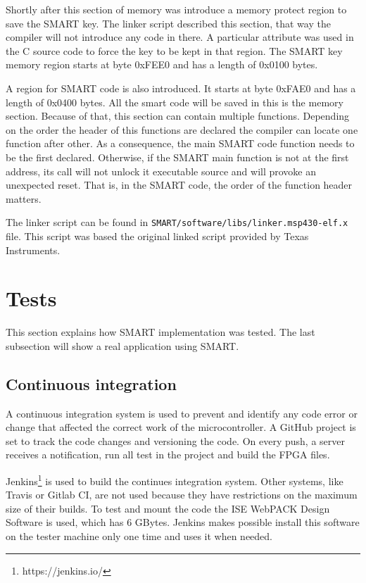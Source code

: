 Shortly after this section of memory was introduce a memory protect region to save the SMART key. The linker script described this section, that way the compiler will not introduce any code in there. A particular attribute was used in the C source code to force the key to be kept in that region. The SMART key memory region starts at byte 0xFEE0 and has a length of  0x0100 bytes.

A region for SMART code is also introduced. It starts at byte 0xFAE0 and has a length of 0x0400 bytes. All the smart code will be saved in this is the memory section. Because of that, this section can contain multiple functions. Depending on the order the header of this functions are declared the compiler can locate one function after other. As a consequence, the main SMART code function needs to be the first declared. Otherwise, if the SMART main function is not at the first address, its call will not unlock it executable source and will provoke an unexpected reset. That is, in the SMART code, the order of the function header matters.

The linker script can be found in \verb|SMART/software/libs/linker.msp430-elf.x| file. This script was based the original linked script provided by Texas Instruments.

\section{Tests}

This section explains how SMART implementation was tested. The last subsection will show a real application using SMART. 

\subsection{Continuous integration}

A continuous integration system is used to prevent and identify any code error or change that affected the correct work of the microcontroller. A GitHub project is set to track the code changes and versioning the code.  On every push, a server receives a notification, run all test in the project and build the FPGA files. 

Jenkins\footnote{https://jenkins.io/} is used to build the continues integration system. Other systems, like Travis or Gitlab CI, are not used because they have restrictions on the maximum size of their builds. To test and mount the code the ISE WebPACK Design Software is used, which has  6 GBytes. Jenkins makes possible install this software on the tester machine only one time and uses it when needed. 

